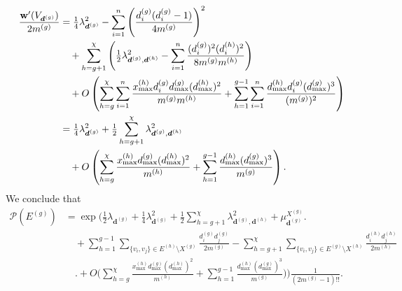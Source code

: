 \documentclass{article}
\theoremstyle{plain}
\theoremstyle{remark}
\theoremstyle{plain}
\numberwithin{equation}{section}
\renewcommand{\d}{{\boldsymbol{d}}}
\renewcommand{\b}{{\bf{w}}}
\begin{document}
	\begin{align}
		\frac{\b'(V_{\d^{(g)}})}{2m^{(g)}}&=\tfrac14\lambda_{\d^{(g)}}^2-\sum_{i=1}^{n}\left(\frac{d_i^{(g)}(d_i^{(g)}-1)}{4m^{(g)}}\right)^2
		\\&\quad+\sum_{h=g+1}^{\chi}\left(\tfrac12\lambda_{\d^{(g)},\d^{(h)}}^2-\sum_{i=1}^{n}\frac{(d_i^{(g)})^2(d_i^{(h)})^2}{8m^{(g)}m^{(h)}}\right)
		\\&\quad+O\left(\sum_{h=g}^{\chi}\sum_{i=1}^{n}\frac{x_{\max}^{(h)}d_i^{(g)}d_{\max}^{(g)}(d_{\max}^{(h)})^2}{m^{(g)}m^{(h)}}+\sum_{h=1}^{g-1}\sum_{i=1}^{n}\frac{d_{\max}^{(h)}d_i^{(g)}(d_{\max}^{(g)})^3}{(m^{(g)})^2}\right)
		\\&=\tfrac14\lambda_{\d^{(g)}}^2+\tfrac12\sum_{h=g+1}^{\chi}\lambda_{\d^{(g)},\d^{(h)}}^2
		\\&\quad+O\left(\sum_{h=g}^{\chi}\frac{x_{\max}^{(h)}d_{\max}^{(g)}(d_{\max}^{(h)})^2}{m^{(h)}}+\sum_{h=1}^{g-1}\frac{d_{\max}^{(h)}(d_{\max}^{(g)})^3}{m^{(g)}}\right).
	\end{align}
	We conclude that
	\begin{align}
		\mathscr{P}(E^{(g)})&=\exp\Bigg(\tfrac12\lambda_{\d^{(g)}}+\tfrac14\lambda_{\d^{(g)}}^2+\tfrac12\sum_{h=g+1}^{\chi}\lambda_{\d^{(g)},\d^{(h)}}^2+\mu_{\d^{(g)}}^{X^{(g)}}\Bigg.
		\\&\quad+\sum_{h=1}^{g-1}\sum_{\{v_i,v_j\}\in E^{(h)}\setminus X^{(g)}}\frac{d_i^{(g)}d_j^{(g)}}{2m^{(g)}}-\sum_{h=g+1}^{\chi}\sum_{\{v_i,v_j\}\in E^{(g)}\setminus X^{(h)}}\frac{d_i^{(h)}d_j^{(h)}}{2m^{(h)}}
		\\&\quad\Bigg.+O\Bigg(\sum_{h=g}^{\chi}\frac{x_{\max}^{(h)}d_{\max}^{(g)}(d_{\max}^{(h)})^2}{m^{(h)}}+\sum_{h=1}^{g-1}\frac{d_{\max}^{(h)}(d_{\max}^{(g)})^3}{m^{(g)}}\Bigg)\Bigg)\frac1{(2m^{(g)}-1)!!}.
	\end{align}
	
\end{document}
